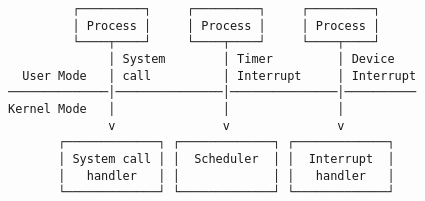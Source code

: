 \documentclass[varwidth=50em,crop]{standalone}
\begin{document}
\begin{verbatim}
         ┌─────────┐     ┌─────────┐     ┌─────────┐
         │ Process │     │ Process │     │ Process │
         └────┬────┘     └────┬────┘     └────┬────┘
              │ System        │ Timer         │ Device
  User Mode   │ call          │ Interrupt     │ Interrupt 
──────────────│───────────────│───────────────│──────────
Kernel Mode   │               │               │ 
              v               v               v
       ┌─────────────┐ ┌─────────────┐ ┌─────────────┐
       │ System call │ │  Scheduler  │ │  Interrupt  │
       │   handler   │ │             │ │   handler   │
       └─────────────┘ └─────────────┘ └─────────────┘
\end{verbatim}
\end{document}
